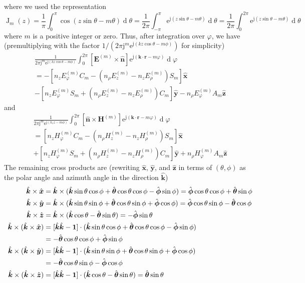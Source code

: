 \documentclass[a4paper,12pt]{article}
\renewcommand{\vec}[1]{\boldsymbol{#1}}
\newcommand{\unitvec}[1]{\hat{\vec{#1}}}
\newcommand{\mrm}[1]{\mathrm{#1}}
\newcommand{\diff}{\operatorname{d}\!}
\newcommand{\mat}[1]{\mathbf{#1}}
\newcommand{\ju}{\mrm{j}}
\newcommand{\eu}{\mrm{e}}
\newcommand{\Ev}{\vec{E}}
\newcommand{\Hv}{\vec{H}}
\newcommand{\rv}{\vec{r}}
\newcommand{\kv}{\vec{k}}
\newcommand{\xuv}{\unitvec{x}}
\newcommand{\yuv}{\unitvec{y}}
\newcommand{\zuv}{\unitvec{z}}
\newcommand{\nuv}{\unitvec{n}}
\newcommand{\kuv}{\unitvec{k}}
\newcommand{\thetauv}{\unitvec{\theta}}
\newcommand{\phiuv}{\unitvec{\phi}}
\newcommand{\BesselJ}{\operatorname{J}}
\begin{document}
where we used the representation \cite[9.1.21]{Abramowitz+Stegun1970}
\begin{equation}
  \BesselJ_{m}(z) = \frac{1}{\pi}\int_{0}^{\pi}\cos(z\sin\theta-m\theta)\diff\theta = \frac{1}{2\pi}\int_{-\pi}^{\pi}\eu^{\ju(z\sin\theta-m\theta)}\diff\theta = \frac{1}{2\pi}\int_{0}^{2\pi}\eu^{\ju(z\sin\theta-m\theta)}\diff\theta
\end{equation}
where $m$ is a positive integer or zero. Thus, after integration over
$\varphi$, we have (premultiplying with the factor
$1/(2\pi\ju^{m}\eu^{\ju(kz\cos\theta-m\phi)})$ for simplicity)
\begin{multline}
  \frac{1}{2\pi\ju^{m}\eu^{\ju(kz\cos\theta-m\phi)}}\int_{0}^{2\pi}
  [\Ev^{(m)}\times\nuv]\eu^{\ju(\kv\cdot\rv-m\varphi)}\diff\varphi \\
  = -\left[ n_{z}E_{\varphi}^{(m)}C_{m}
  - (n_{\rho}E_{z}^{(m)} - n_{z}E_{\rho}^{(m)})S_{m} \right]\xuv \\
  - \left[ n_{z}E_{\varphi}^{(m)}S_{m}
  + (n_{\rho}E_{z}^{(m)} - n_{z}E_{\rho}^{(m)}) C_{m} \right] \yuv 
  - n_{\rho}E_{\varphi}^{(m)}A_{m} \zuv
\end{multline}
and
\begin{multline}
  \frac{1}{2\pi\ju^{m}\eu^{\ju(k_{z}z-m\phi)}}\int_{0}^{2\pi}
  [\nuv\times\Hv^{(m)}]\eu^{\ju(\kv\cdot\rv-m\varphi)}\diff\varphi \\
  = \left[ n_{z}H_{\varphi}^{(m)}C_{m}
  - (n_{\rho}H_{z}^{(m)} - n_{z}H_{\rho}^{(m)})S_{m} \right] \xuv \\
  + \left[n_{z}H_{\varphi}^{(m)}S_{m}
    + (n_{\rho}H_{z}^{(m)} - n_{z}H_{\rho}^{(m)})C_{m} \right] \yuv 
  + n_{\rho}H_{\varphi}^{(m)}A_{m} \zuv
\end{multline}
The remaining cross products are (rewriting $\xuv$, $\yuv$, and $\zuv$
in terms of $(\theta,\phi)$ as the polar angle and azimuth angle in
the direction $\kuv$)
\begin{align}
  \kuv\times\xuv &= \kuv\times(\kuv\sin\theta\cos\phi + \thetauv\cos\theta\cos\phi - \phiuv\sin\phi) = \phiuv\cos\theta\cos\phi + \thetauv\sin\phi \\
  \kuv\times\yuv &= \kuv\times(\kuv\sin\theta\sin\phi + \thetauv\cos\theta\sin\phi + \phiuv\cos\phi) = \phiuv\cos\theta\sin\phi - \thetauv\cos\phi \\
  \kuv\times\zuv &= \kuv\times(\kuv\cos\theta - \thetauv\sin\theta) = -\phiuv\sin\theta \\
  \kuv\times(\kuv\times\xuv) &= [\kuv\kuv-\mat{1}]\cdot(\kuv\sin\theta\cos\phi + \thetauv\cos\theta\cos\phi - \phiuv\sin\phi) \notag \\
                 &= -\thetauv\cos\theta\cos\phi + \phiuv\sin\phi \\
  \kuv\times(\kuv\times\yuv) &= [\kuv\kuv-\mat{1}]\cdot(\kuv\sin\theta\sin\phi + \thetauv\cos\theta\sin\phi + \phiuv\cos\phi) \notag \\
  &= - \thetauv\cos\theta\sin\phi - \phiuv\cos\phi \\
  \kuv\times(\kuv\times\zuv) &= [\kuv\kuv-\mat{1}]\cdot(\kuv\cos\theta-\thetauv\sin\theta) = \thetauv\sin\theta
\end{align}
\end{document}

